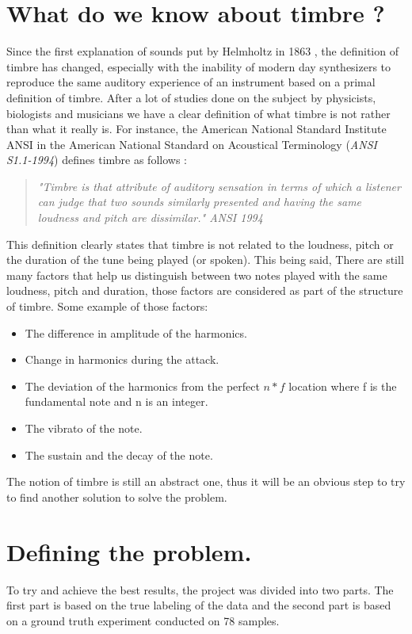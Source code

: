 \documentclass[hidelinks,12pt]{report}
\begin{document}
\section{What do we know about timbre ?}
Since the first explanation of sounds put by Helmholtz in 1863 \cite{H95}, the definition of timbre has changed, especially with the inability of modern day synthesizers to reproduce the same auditory experience of an instrument based on a primal definition of timbre. After a lot of studies done on the subject by physicists, biologists and musicians we have a clear definition of what timbre is not rather than what it really is. For instance, the American National Standard Institute ANSI in the American National Standard on Acoustical Terminology (\textit{ANSI S1.1-1994}) defines timbre as follows :
\begin{quote}
\textit{"Timbre is that attribute of auditory sensation in terms of which a listener can judge that two sounds similarly presented and having the same loudness and pitch are dissimilar." ANSI 1994}
\end{quote}
This definition clearly states that timbre is not related to the loudness, pitch or the duration of the tune being played (or spoken). This being said, There are still many factors that help us distinguish between two notes played with the same loudness, pitch and duration, those factors are considered as part of the structure of timbre. Some example of those factors:
\begin{itemize}
\item The difference in amplitude of the harmonics.
\item Change in harmonics during the attack.
\item The deviation of the harmonics from the perfect $n*f$ location where f is the fundamental note and n is an integer.
\item The vibrato of the note.
\item The sustain and the decay of the note. 
\end{itemize}
The notion of timbre is still an abstract one, thus it will be an obvious step to try to find another solution to solve the problem.
\section{Defining the problem.}
To try and achieve the best results, the project was divided into two parts. The first part is based on the true labeling of the data and the second part is based on a ground truth experiment conducted on 78 samples.
\end{document}
